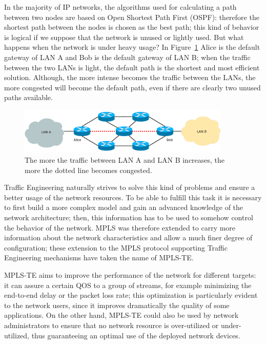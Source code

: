 \documentclass[10pt,a4paper]{report}
\begin{document}
In the majority of IP networks, the algorithms used for calculating a
path between two nodes are based on Open Shortest Path First (OSPF):
therefore the shortest path between the nodes is chosen as the best
path; this kind of behavior is logical if we suppose that the network
is unused or lightly used. But what happens when the network is under
heavy usage? In Figure~\ref{fig:mpls_te} Alice is the default gateway
of LAN A and Bob is the default gateway of LAN B; when the traffic
between the two LANs is light, the default path is the shortest and
most efficient solution. Although, the more intense becomes the
traffic between the LANs, the more congested will become the default
path, even if there are clearly two unused paths available.

\begin{figure}[!hbp]
  \centering
  \includegraphics[width=0.9\textwidth]{img/mpls_te}
  \caption[Traffic Engineering]{The more the traffic between LAN A and
    LAN B increases, the more the dotted line becomes congested.}
  \label{fig:mpls_te}
\end{figure}

Traffic Engineering naturally strives to solve this kind of problems
and ensure a better usage of the network resources. To be able to
fulfill this task it is necessary to first build a more complex model
and gain an advanced knowledge of the network architecture; then, this
information has to be used to somehow control the behavior of the
network. MPLS was therefore extended to carry more information about
the network characteristics and allow a much finer degree of
configuration; these extension to the MPLS protocol supporting Traffic
Engineering mechanisms have taken the name of MPLS-TE.

MPLS-TE aims to improve the performance of the network for different
targets: it can assure a certain QOS to a group of streams, for
example minimizing the end-to-end delay or the packet loss rate; this
optimization is particularly evident to the network users, since it
improves dramatically the quality of some applications. On the other
hand, MPLS-TE could also be used by network administrators to ensure
that no network resource is over-utilized or under-utilized, thus
guaranteeing an optimal use of the deployed network devices.
\end{document}
